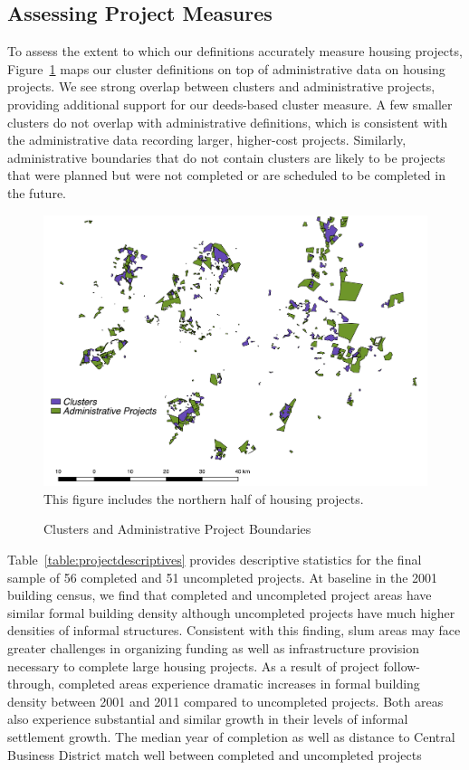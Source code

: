 \documentclass[12pt]{article}
\begin{document}
\subsection{Assessing Project Measures}

To assess the extent to which our definitions accurately measure housing projects, Figure~\ref{figure:gcrooverlap} maps our cluster definitions on top of administrative data on housing projects.  We see strong overlap between clusters and administrative projects, providing additional support for our deeds-based cluster measure.  A few smaller clusters do not overlap with administrative definitions, which is consistent with the administrative data recording larger, higher-cost projects.  Similarly, administrative boundaries that do not contain clusters are likely to be projects that were planned but were not completed or are scheduled to be completed in the future.

\begin{figure}
\caption{Clusters and Administrative Project Boundaries}\label{figure:gcrooverlap}
\centering
\includegraphics[scale=.5]{figures/gcro_convexhull_overlap.pdf} \\
This figure includes the northern half of housing projects.
\end{figure}

Table~\ref{table:projectdescriptives} provides descriptive statistics for the final sample of 56 completed and 51 uncompleted projects.  At baseline in the 2001 building census, we find that completed and uncompleted project areas have similar formal building density although uncompleted projects have much higher densities of informal structures.  Consistent with this finding, slum areas may face greater challenges in organizing funding as well as infrastructure provision necessary to complete large housing projects.  As a result of project follow-through, completed areas experience dramatic increases in formal building density between 2001 and 2011 compared to uncompleted projects.  Both areas also experience substantial and similar growth in their levels of informal settlement growth.  The median year of completion as well as distance to Central Business District match well between completed and uncompleted projects 
\end{document}
